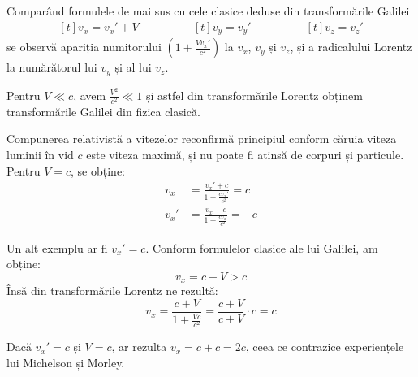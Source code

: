 Comparând formulele de mai sus cu cele clasice deduse din transformările
Galilei
\begin{equation*}
    \begin{aligned}[t]
        v_x = v_x' + V
    \end{aligned}\qquad\qquad
    \begin{aligned}[t]
        v_y = v_y'
    \end{aligned}\qquad\qquad
    \begin{aligned}[t]
        v_z = v_z'
    \end{aligned}
\end{equation*}
se observă apariția numitorului \( \left( 1 + \frac{Vv_x'}{c^2} \right) \) la
$v_x$, $v_y$ și $v_z$, și a radicalului Lorentz la numărătorul lui $v_y$ și al
lui $v_z$.

Pentru \( V \ll c \), avem \( \frac{V^2}{c^2} \ll 1 \) și astfel din
transformările Lorentz obținem transformările Galilei din fizica clasică.

Compunerea relativistă a vitezelor reconfirmă principiul conform căruia viteza
luminii în vid $c$ este viteza maximă, și nu poate fi atinsă de corpuri și
particule. Pentru \( V = c \), se obține:
\begin{equation*}
    \begin{aligned}
        v_x &= \frac{v_x' + c}{1 + \frac{cv_x'}{c^2}} = c \\
        v_x' &= \frac{v_x - c}{1 - \frac{cv_x}{c^2}} = -c
    \end{aligned}
\end{equation*}

Un alt exemplu ar fi \( v_x' = c \). Conform formulelor clasice ale lui Galilei, am obține:
\[ v_x = c + V > c \]
Însă din transformările Lorentz ne rezultă:
\[ v_x = \frac{c + V}{1 + \frac{Vc}{c^2}} = \frac{c + V}{c + V} \cdot c = c \]

Dacă \( v_x' = c \) și \( V = c \), ar rezulta \( v_x = c + c = 2c \), ceea ce
contrazice experiențele lui Michelson și Morley.
